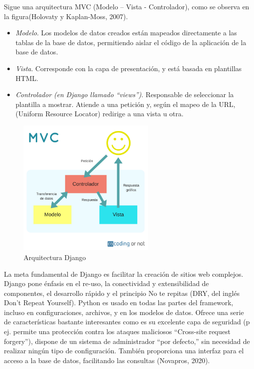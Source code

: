 Sigue una arquitectura MVC (Modelo – Vista - Controlador), como se observa en la figura(Holovaty y Kaplan-Moss, 2007).
\begin{itemize}
	\item \textit{Modelo}. Los modelos de datos creados están mapeados directamente a las tablas de la base de datos, permitiendo aislar el código de la aplicación de la base de datos.

	\item \textit{Vista}. Corresponde con la capa de presentación, y está basada en plantillas HTML.		
	\item \textit{Controlador (en Django llamado “views”)}. Responsable de seleccionar la plantilla a mostrar. Atiende a una petición y, según el mapeo de la URL, (Uniform Resource Locator) redirige a una vista u otra.
\end{itemize}
\begin{figure}[h!]
  \centering
    \includegraphics[width=0.6\textwidth]{img/mvc.png}
  \caption{Arquitectura Django}
  \label{Arquitectura Django}
\end{figure}
La meta fundamental de Django es facilitar la creación de sitios web complejos. Django pone énfasis en el re-uso, la conectividad y extensibilidad de componentes, el desarrollo rápido y el principio No te repitas (DRY, del inglés Don't Repeat Yourself). Python es usado en todas las partes del framework, incluso en configuraciones, archivos, y en los modelos de datos. 
Ofrece una serie de características bastante interesantes como es su excelente capa de seguridad (p ej. permite una protección contra los ataques maliciosos “Cross-site request forgery”), dispone de un sistema de administrador “por defecto,” sin necesidad de realizar ningún tipo de configuración. También proporciona una interfaz para el acceso a la base de datos, facilitando las consultas (Novapros, 2020).


